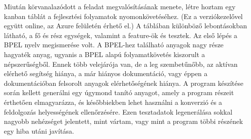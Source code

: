Miután körvanalazódott a feladat megvalósításának menete, létre hoztam egy kanban táblát a fejlesztési folyamatok nyomonkövetéséhez. (Ez a verziókezelővel együtt online, az Azure felületén érhető el.) A táblában különböző lebontásokban látható, a fő és rész egységek, valamint a feature-ök és tesztek. Az első lépés a BPEL nyelv megismerése volt. A BPEL-hez található anyagok nagy része hagyaték anyag, ugyanis a BPEL alapú folyamatkövetés kiszorult a népszerűségből. Ennek több velejárója van, de a leg szembetűnőbb, az aktívan elérhető segítség hiánya, a már hiányos dokumentáció, vagy éppen a dokumentációban felsorolt anyagok elérhetőségének hiánya. A program készítése során kellett generálni egy úgymond tanító anyagot, amely a program részeit érthetően elmagyarázza, és későbbiekben lehet használni a konverzió és a feldolgozás helyességének ellenőrzésére. Ezen tesztadatok legenerálása sokkal nagyobb nehézséget jelentett, mint vártam, vagy mint a program többi részének egy hiba utáni javítása. \\
